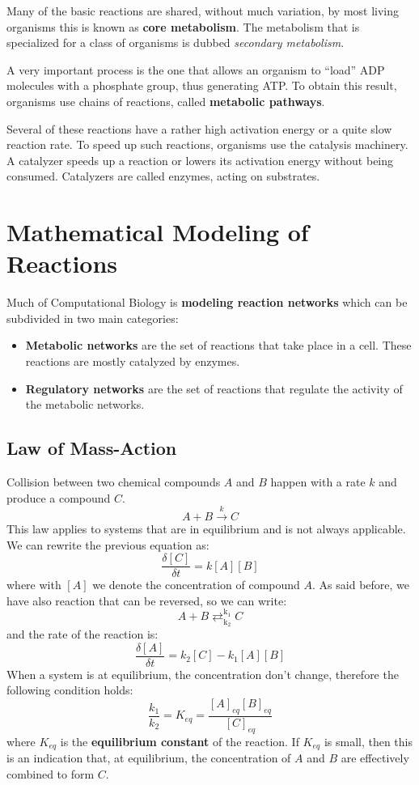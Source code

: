 Many of the basic reactions are shared, without much variation, by most living
organisms this is known as \textbf{core metabolism}. The metabolism that is specialized
for a class of organisms is dubbed \textit{secondary metabolism}.

A very important process is the one that allows an organism to “load” ADP molecules
with a phosphate group, thus generating ATP. To obtain this result, organisms use
chains of reactions, called \textbf{metabolic pathways}.

Several of these reactions have a rather high activation energy or a quite slow
reaction rate. To speed up such reactions, organisms use the catalysis machinery.
A catalyzer speeds up a reaction or lowers its activation energy without being
consumed. Catalyzers are called enzymes, acting on substrates.
\section{Mathematical Modeling of Reactions}
Much of Computational Biology is \textbf{modeling reaction networks} which can be
subdivided in two main categories:
\begin{itemize}
    \item \textbf{Metabolic networks} are the set of reactions that take place
          in a cell. These reactions are mostly catalyzed by enzymes.
    \item \textbf{Regulatory networks} are the set of reactions that regulate
          the activity of the metabolic networks.
\end{itemize}
\subsection{Law of Mass-Action}
Collision between two chemical compounds $A$ and $B$ happen with a rate $k$ and
produce a compound $C$.
\begin{equation*}
    A + B \xrightarrow{k} C
\end{equation*}
This law applies to systems that are in equilibrium and is not always applicable.
We can rewrite the previous equation as:
\begin{equation}
    \frac{\delta [C]}{\delta t} = k [A][B]
\end{equation}
where with $[A]$ we denote the concentration of compound $A$. As said before,
we have also reaction that can be reversed, so we can write:
\begin{equation}
    A + B \mathrel{\mathop{\rightleftarrows}^{\mathrm{k_1}}_{\mathrm{k_2}}} C
\end{equation}
and the rate of the reaction is:
\begin{equation}
    \frac{\delta [A]}{\delta t} = k_2 [C] - k_1 [A][B]
\end{equation}
When a system is at equilibrium, the concentration don't change, therefore the
following condition holds:
\begin{equation}
    \frac{k_1}{k_2} = K_{eq} = \frac{[A]_{eq} [B]_{eq}}{[C]_{eq}}
\end{equation}
where $K_{eq}$ is the \textbf{equilibrium constant} of the reaction. If $K_{eq}$ is small,
then this is an indication that, at equilibrium, the concentration of $A$ and $B$
are effectively combined to form $C$.

